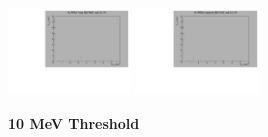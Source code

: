 \begin{center}
  \includegraphics[width=0.245\textwidth]{plots/response_matrix/Total_RHC_CC1Pi_null.pdf}
  \includegraphics[width=0.245\textwidth]{plots/response_matrix/Hadrons_RHC_CC1Pi_null.pdf}

\end{center}

\textbf{10 MeV Threshold}

